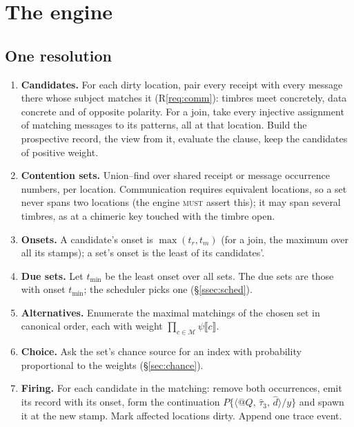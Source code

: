 \documentclass[11pt,a4paper]{article}
\makeatletter
\theoremstyle{definition}
\theoremstyle{remark}
\newcommand{\nm}[3]{\langle @#1,\,#2,\,#3\rangle}
\newcommand{\MUST}{\textsc{must}}
\makeatother
\begin{document}
\section{The engine}\label{sec:engine}

\subsection{One resolution}

\begin{enumerate}[leftmargin=*,itemsep=2pt]
\item \textbf{Candidates.} For each dirty location, pair every receipt with
  every message there whose subject matches it (R\ref{req:comm}): timbres meet
  concretely, data concrete and of opposite polarity. For a join, take every
  injective assignment of matching messages to its patterns, all at that
  location. Build the prospective record, the view from it, evaluate the
  clause, keep the candidates of positive weight.
\item \textbf{Contention sets.} Union--find over shared receipt or message
  occurrence numbers, per location. Communication requires equivalent
  locations, so a set never spans two locations (the engine \MUST{} assert
  this); it may span several timbres, as at a chimeric key touched with the
  timbre open.
\item \textbf{Onsets.} A candidate's onset is $\max(t_r,t_m)$ (for a join, the
  maximum over all its stamps); a set's onset is the least of its candidates'.
\item \textbf{Due sets.} Let $t_{\min}$ be the least onset over all sets. The
  due sets are those with onset $t_{\min}$; the scheduler picks one
  (\S\ref{ssec:sched}).
\item \textbf{Alternatives.} Enumerate the maximal matchings of the chosen set
  in canonical order, each with weight $\prod_{c\in\mathcal M}\psi\llbracket
  c\rrbracket$.
\item \textbf{Choice.} Ask the set's chance source for an index with
  probability proportional to the weights (\S\ref{sec:chance}).
\item \textbf{Firing.} For each candidate in the matching: remove both
  occurrences, emit its record with its onset, form the continuation
  $P\{\nm{Q}{\hat\tau_3}{\hat d}/y\}$ and spawn it at the new stamp. Mark
  affected locations dirty. Append one trace event.
\end{enumerate}
\end{document}
